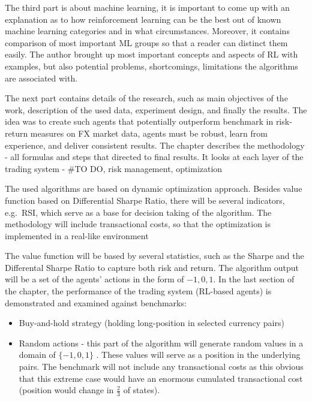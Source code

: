 \documentclass[]{article}
\providecommand{\tightlist}{%
  \setlength{\itemsep}{0pt}\setlength{\parskip}{0pt}}
\begin{document}
The third part is about machine learning, it is important to come up
with an explanation as to how reinforcement learning can be the best out
of known machine learning categories and in what circumstances.
Moreover, it contains comparison of most important ML groups so that a
reader can distinct them easily. The author brought up most important
concepts and aspects of RL with examples, but also potential problems,
shortcomings, limitations the algorithms are associated with.

The next part contains details of the research, such as main objectives
of the work, description of the used data, experiment design, and
finally the results. The idea was to create such agents that potentially
outperform benchmark in risk-return measures on FX market data, agents
must be robust, learn from experience, and deliver consistent results.
The chapter describes the methodology - all formulas and steps that
directed to final results. It looks at each layer of the trading system
- \#TO DO, risk management, optimization

The used algorithms are based on dynamic optimization approach. Besides
value function based on Differential Sharpe Ratio, there will be several
indicators, e.g.~RSI, which serve as a base for decision taking of the
algorithm. The methodology will include transactional costs, so that the
optimization is implemented in a real-like environment

The value function will be based by several statistics, such as the
Sharpe and the Differental Sharpe Ratio to capture both risk and return.
The algorithm output will be a set of the agents' actions in the form of
\({-1,0,1}\). In the last section of the chapter, the performance of the
trading system (RL-based agents) is demonstrated and examined against
benchmarks:

\begin{itemize}
\tightlist
\item
  Buy-and-hold strategy (holding long-position in selected currency
  pairs)
\item
  Random actions - this part of the algorithm will generate random
  values in a domain of \(\{-1,0,1\}\) . These values will serve as a
  position in the underlying pairs. The benchmark will not include any
  transactional costs as this obvious that this extreme case would have
  an enormous cumulated transactional cost (position would change in
  \(\frac{2}{3}\) of states).
\end{itemize}
\end{document}
